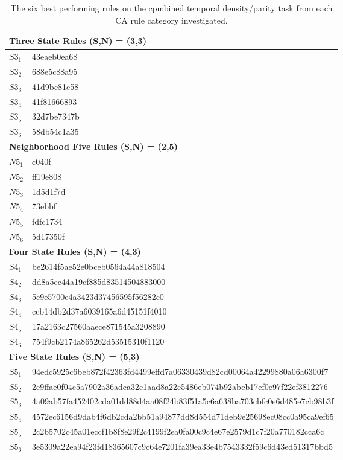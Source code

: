 \documentclass{elsarticle}
\begin{document}
\begin{multicols}{2}
\begin{table}[!htbp] \centering
\small
\begin{tabular}{|p{2cm}|l|}
\hline
\multicolumn{2}{|l|}{\textbf{Three State Rules (S,N) = (3,3)}} \\ \hline
$S3_{1}$ &  43eaeb0ea68\\\hline
$S3_{2}$ &  688e5c88a95\\ \hline
$S3_{3}$ &  41d9be81e58\\ \hline
$S3_{4}$ &   41f81666893\\ \hline
$S3_{5}$ &   32d7be7347b\\ \hline
$S3_{6}$ &   58db54c1a35\\ \hline
\multicolumn{2}{|l|}{\textbf{Neighborhood Five Rules (S,N) = (2,5)}} \\ \hline
$N5_{1}$ &   c040f\\ \hline
$N5_{2}$ &   ff19e808\\ \hline
$N5_{3}$ &   1d5d1f7d\\ \hline
$N5_{4}$ &   73ebbf\\ \hline
$N5_{5}$ &   fdfc1734\\ \hline
$N5_{6}$ &   5d17350f\\ \hline
\multicolumn{2}{|l|}{\textbf{Four State Rules (S,N) = (4,3)}} \\ \hline
$S4_{1}$ &   be2614f5ae52e0bceb0564a44a818504\\ \hline
$S4_{2}$ &   dd8a5ec44a19cf885d83514504883000\\ \hline
$S4_{3}$ &   5c9e5700e4a3423d37456595f56282c0\\ \hline
$S4_{4}$ &   ccb14db2d37a6039165a6d45151f4010\\ \hline
$S4_{5}$ &   17a2163c27560aaece871545a3208890\\ \hline
$S4_{6}$ &   754f9cb2174a865262d53515310f1120\\
\hline
\multicolumn{2}{|l|}{\textbf{Five State Rules (S,N) = (5,3)}} \\ \hline
 $S5_{1}$ &
94edc5925c6beb872f42363fd4499effd7a06330439d82cd00064a42299880a06a6300f7   \\
    \hline
    $S5_{2}$ &
2e9ffae0f04c5a7902a36adca32e1aad8a22e5486eb074b92abcb17ef0e97f22ef3812276\\\hline
$S5_{3}$ & 
4a09ab57fa452402cda01dd88d4aa08f24b83f51a5c6a638ba703cbfc0e6d485e7cb98b3f \\ 
\hline
$S5_{4}$  &
4572ec6156d9dab4f6db2cda2bb51a94877dd8d554d71deb9e25698ec08cc0a95ca9ef65 \\ 
    \hline
$S5_{5}$ &
2c2b5702c45a01eccf1b8f8e29f2c4199f2ea0fa00c9c4e67e2579d1c7f20a770182cca6c \\ 
    \hline
$S5_{6}$ &
3e5309a22ea94f23fd18365607c9c64e7201fa39ea33e4b7543332f59c6d43ed51317bbd5 \\ 
    \hline
\end{tabular}
\caption{The six best performing rules on the cpmbined temporal density/parity 
   task from each CA rule category investigated.}
\label{table:rules_temp_dens}
\end{table}



\end{multicols}
\end{document}
